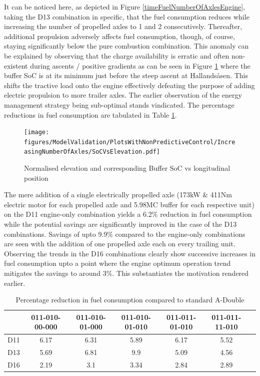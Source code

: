 \documentclass[ExampleMasters.tex]{subfiles}
\begin{document}
	It can be noticed here, as depicted in Figure \ref{timeFuelNumberOfAxlesEngine}, taking the D13 combination in specific, that the fuel consumption reduces while increasing the number of propelled axles to 1 and 2 consecutively. Thereafter, additional propulsion adversely affects fuel consumption, though, of course, staying significantly below the pure combustion combination. This anomaly can be explained by observing that the charge availability is erratic and often non-existent during ascents / positive gradients as can be seen in Figure \ref{SoCVsPosition} where the buffer SoC is at its minimum just before the steep ascent at Hallands\aa sen. This shifts the tractive load onto the engine effectively defeating the purpose of adding electric propulsion to more trailer axles. The earlier observation of the energy management strategy being sub-optimal stands vindicated. The percentage reductions in fuel consumption are tabulated in Table \ref{table:fuelConsumptionReductionAxles}.
	\begin{figure}
	\texttt{[image: figures/ModelValidation/PlotsWithNonPredictiveControl/IncreasingNumberOfAxles/SoCVsElevation.pdf]}
	\caption{Normalised elevation and corresponding Buffer SoC vs longitudinal position}
	\label{SoCVsPosition}
	\end{figure}
	The mere addition of a single electrically propelled axle (173kW \& 411Nm electric motor for each propelled axle and 5.98MC buffer for each respective unit) on the D11 engine-only combination yields a 6.2\% reduction in fuel consumption while the potential savings are significantly improved in the case of the D13 combinations. Savings of upto 9.9\% compared to the engine-only combinations are seen with the addition of one propelled axle each on every trailing unit. Observing the trends in the D16 combinations clearly show successive increases in fuel consumption upto a point where the engine optimum operation trend mitigates the savings to around 3\%. This substantiates the motivation rendered earlier.
	\begin{table}
	\centering
	\begin{tabular}{|c|c|c|c|c|c|c|}
	\hline
	& 011-010-00-000 & 011-010-01-000 & 011-010-01-010 & 011-011-01-010 & 011-011-11-010 \\
	\hline
	D11 & 6.17 & 6.31 & 5.89 & 6.17 & 5.52 \\
	\hline
	D13 & 5.69 & 6.81 & 9.9 & 5.09 & 4.56 \\
	\hline
	D16 & 2.19 & 3.1 & 3.34 & 2.84 & 2.89 \\
	\hline
	\end{tabular}
	\caption{Percentage reduction in fuel consumption compared to standard A-Double}
	\label{table:fuelConsumptionReductionAxles}
	\end{table}
\end{document}
